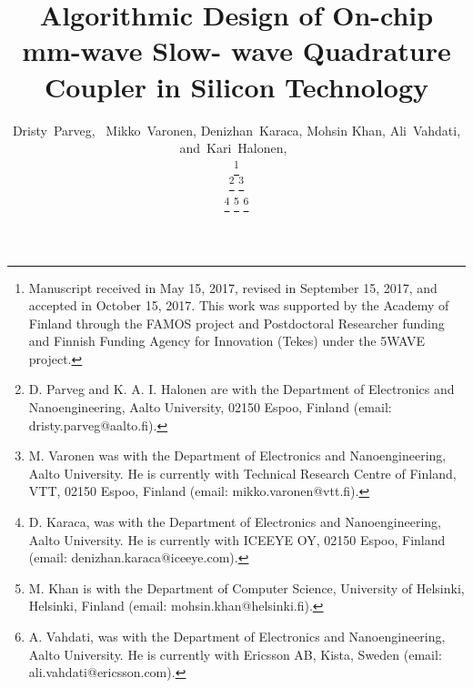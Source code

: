 \documentclass[journal]{IEEEtran}
\begin{document}
%
\title{Algorithmic Design of On-chip mm-wave Slow-
	wave Quadrature Coupler in Silicon Technology}
%
%
%

\author{Dristy~Parveg,~
        Mikko~Varonen, Denizhan~Karaca, Mohsin Khan, Ali~Vahdati,
        and~Kari~Halonen,~%

\thanks{Manuscript received in May 15, 2017, revised in September 15, 2017, and
	accepted  in  October  15,  2017.  This  work  was  supported  by  the  Academy  of
	Finland through the FAMOS project and Postdoctoral Researcher funding and
	Finnish Funding Agency for Innovation (Tekes) under the 5WAVE project.} 
	
\thanks{D. Parveg and K. A. I. Halonen are with the Department of Electronics  and  Nanoengineering,  Aalto  University,  02150  Espoo,  Finland  (email: dristy.parveg@aalto.fi).}%
\thanks{M. Varonen was with the Department of Electronics  and  Nanoengineering, Aalto
	University. He is currently with Technical Research Centre of Finland, VTT,
	02150 Espoo, Finland (email: mikko.varonen@vtt.fi).}%

\thanks{D. Karaca,  was  with  the  Department  of  Electronics  and  Nanoengineering,  Aalto University. He is currently with ICEEYE OY, 02150 Espoo, Finland (email:
	denizhan.karaca@iceeye.com).}%
\thanks{M. Khan is with the Department of Computer Science, University of Helsinki,
	Helsinki, Finland (email: mohsin.khan@helsinki.fi).}%
\thanks{A. Vahdati,  was  with  the  Department  of  Electronics  and  Nanoengineering,  Aalto University. He is currently with Ericsson AB, Kista, Sweden (email:
	ali.vahdati@ericsson.com).}}
\end{document}
